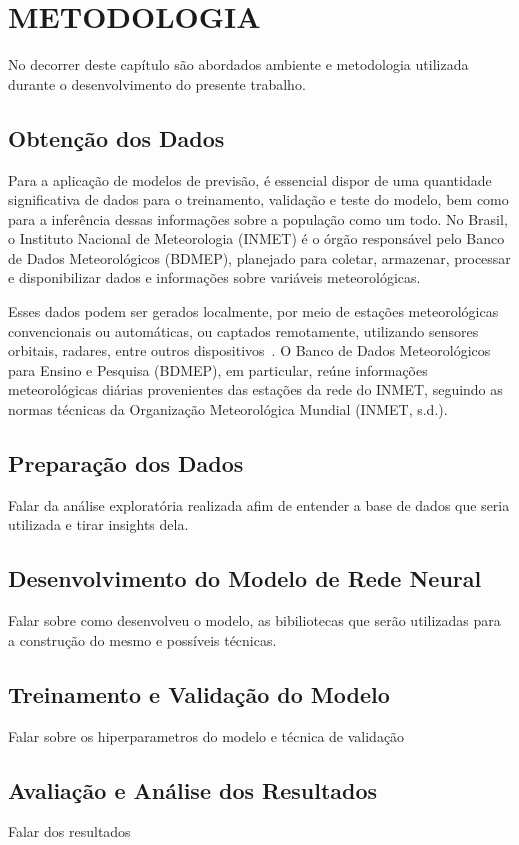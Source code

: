 \chapter{METODOLOGIA}

No decorrer deste capítulo são abordados ambiente e metodologia utilizada durante o
desenvolvimento do presente trabalho.

\section{Obtenção dos Dados}

    Para a aplicação de modelos de previsão, é essencial dispor de uma quantidade significativa de dados para o 
    treinamento, validação e teste do modelo, bem como para a inferência dessas informações sobre a população como um 
    todo. No Brasil, o Instituto Nacional de Meteorologia (INMET) é o órgão responsável pelo Banco de Dados 
    Meteorológicos (BDMEP), planejado para coletar, armazenar, processar e disponibilizar dados e informações sobre 
    variáveis meteorológicas. 

    Esses dados podem ser gerados localmente, por meio de estações meteorológicas convencionais ou automáticas, 
    ou captados remotamente, utilizando sensores orbitais, radares, entre outros dispositivos~\cite{vianna2017}. 
    O Banco de Dados Meteorológicos para Ensino e Pesquisa (BDMEP), em particular, reúne informações meteorológicas 
    diárias provenientes das estações da rede do INMET, seguindo as normas técnicas da Organização Meteorológica 
    Mundial (INMET, s.d.).

\section{Preparação dos Dados}
    Falar da análise exploratória realizada afim de entender a base de dados que seria utilizada e tirar
    insights dela.

\section{Desenvolvimento do Modelo de Rede Neural}
    Falar sobre como desenvolveu o modelo, as bibiliotecas que serão utilizadas para a construção do mesmo
    e possíveis técnicas.
\section{Treinamento e Validação do Modelo}
    Falar sobre os hiperparametros do modelo e técnica de validação
\section{Avaliação e Análise dos Resultados}
    Falar dos resultados